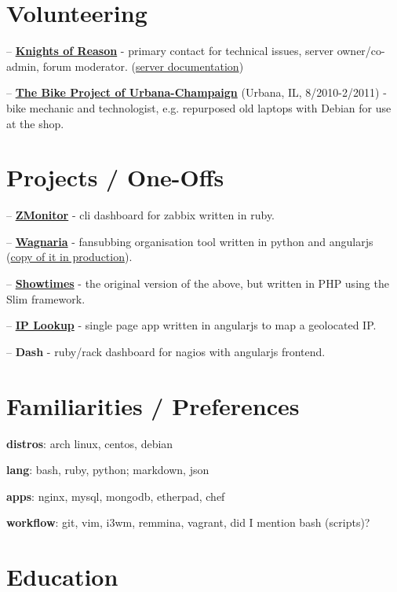 \documentclass{article}
\begin{document}
\section{Volunteering}

-- \href{http://knightsofreason.net}{\textbf{Knights of Reason}} - primary contact for technical issues, server owner/co-admin, forum moderator. (\href{https://wiki.milkteafuzz.com}{server documentation})\par
-- \href{http://thebikeproject.org}{\textbf{The Bike Project of Urbana-Champaign}} (Urbana, IL, 8/2010-2/2011) - bike mechanic and technologist, e.g. repurposed old laptops with Debian for use at the shop.\par

\section{Projects / One-Offs}

-- \href{https://github.com/liliff/zmonitor}{\textbf{ZMonitor}} - cli dashboard for zabbix written in ruby.\par
-- \href{https://github.com/liliff/wagnaria}{\textbf{Wagnaria}} - fansubbing organisation tool written in python and angularjs (\href{https://c.milkteafuzz.com/index.html}{copy of it in production}).\par
-- \href{https://github.com/liliff/showtimes}{\textbf{Showtimes}} - the original version of the above, but written in PHP using the Slim framework.\par
-- \href{http://ip.milk.tea.jp}{\textbf{IP Lookup}} - single page app written in angularjs to map a geolocated IP.\par
-- \textbf{Dash} - ruby/rack dashboard for nagios with angularjs frontend.\par

\section{Familiarities / Preferences}

\textbf{distros}: arch linux, centos, debian\par
\textbf{lang}: bash, ruby, python; markdown, json\par
\textbf{apps}: nginx, mysql, mongodb, etherpad, chef\par
\textbf{workflow}: git, vim, i3wm, remmina, vagrant, did I mention bash (scripts)?\par

\section{Education}
\end{document}
